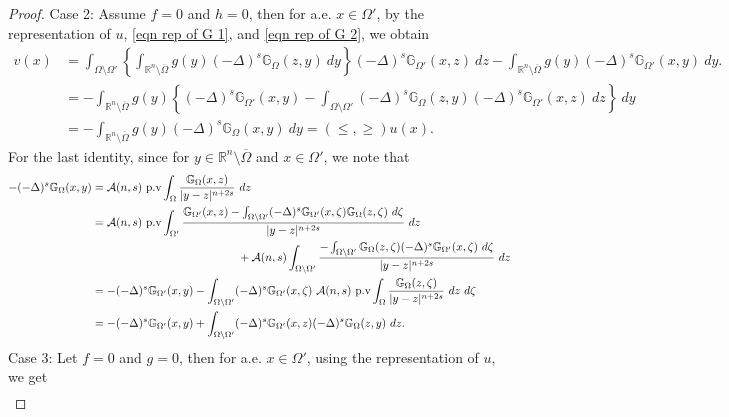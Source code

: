 \documentclass{amsart}
\newcommand{\R}{\mathbb{R}}
\newcommand{\slap}{(-\Delta)^{s}}
\newcommand{\gk}[1]{\mathbb{G}_{#1}}
\begin{document}
\begin{proof}
     Case 2: Assume $f=0$ and $h=0$, then for a.e. $x\in \Omega'$, by the representation of $u$, \eqref{eqn rep of G 1}, and \eqref{eqn rep of G 2}, we obtain
     \begin{equation*}
         \begin{split}
             v(x)
             &=\int_{\Omega\setminus\Omega'}\left\{\int_{\R^{n}\setminus\overline{\Omega}}g(y)\slap \gk{\Omega}(z,y)\ dy\right\}\slap \gk{\Omega'}(x,z)\ dz-\int_{\R^{n}\setminus\overline{\Omega}}g(y)\slap \gk{\Omega'}(x,y)\ dy.\\
             &=-\int_{\R^{n}\setminus\overline{\Omega}}g(y)\left\{\slap\gk{\Omega'}(x,y)-\int_{\Omega\setminus\Omega'}\slap \gk{\Omega}(z,y) \slap \gk{\Omega'}(x,z)\ dz\right\}\ dy\\
             &=-\int_{\R^{n}\setminus\overline{\Omega}}g(y)\slap\gk{\Omega}(x,y)\ dy=(\leq,\geq)u(x).
         \end{split}
     \end{equation*}
     For the last identity, since for $y\in \R^{n}\setminus\overline{\Omega}$ and $x\in \Omega'$, we note that
     \begin{equation*}
         \begin{split}
              -\slap \gk{\Omega}(x,y)& =\mathcal{A}(n,s)\text{ p.v} \int_{\Omega}\frac{\gk{\Omega}(x,z)}{|y-z|^{n+2s}}\ dz\\ 
             &=\mathcal{A}(n,s)\text{ p.v} \int_{\Omega'}\frac{\gk{\Omega'}(x,z)-\int_{\Omega\setminus\Omega'}\slap \gk{\Omega'}(x,\zeta)\gk{\Omega}(z,\zeta)\ d\zeta}{|y-z|^{n+2s}}\ dz \\
              &\hspace{4.5cm}  +\mathcal{A}(n,s)\int_{\Omega\setminus\Omega'}\frac{-\int_{\Omega\setminus\Omega'}\gk{\Omega}(z,\zeta)\slap\gk{\Omega'}(x,\zeta)\ d\zeta}{|y-z|^{n+2s}}\ dz\\
             &=-\slap\gk{\Omega'}(x,y)-\int_{\Omega\setminus\Omega'}\slap\gk{\Omega'}(x,\zeta) ~\mathcal{A}(n,s)\text{ p.v} \int_{\Omega}\frac{\gk{\Omega}(z,\zeta)}{|y-z|^{n+2s}}\ dz\ d\zeta\\
             &=-\slap\gk{\Omega'}(x,y)+\int_{\Omega\setminus\Omega'}\slap\gk{\Omega'}(x,z) \slap\gk{\Omega}(z,y)\ dz.
             \end{split}
     \end{equation*}
Case 3: Let $f=0$ and $g=0$, then for a.e. $x\in\Omega'$, using the representation of $u$,  we get
\begin{equation*}
    \begin{split}

\end{split}
\end{equation*}
\end{proof}
\end{document}
